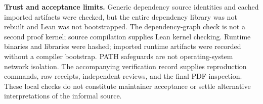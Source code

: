 \documentclass[11pt]{article}
\begin{document}
\textbf{Trust and acceptance limits.} Generic dependency source identities and
cached imported artifacts were checked, but the entire dependency library was
not rebuilt and Lean was not bootstrapped. The dependency-graph check is not a
second proof kernel; source compilation supplies Lean kernel checking.
Runtime binaries and libraries were hashed; imported runtime artifacts were
recorded without a compiler bootstrap. PATH safeguards are not operating-system
network isolation. The accompanying verification record supplies reproduction
commands, raw receipts, independent reviews, and the final PDF inspection.
These local checks do not constitute maintainer acceptance or settle alternative
interpretations of the informal source.
\end{document}
